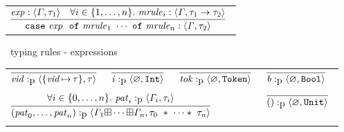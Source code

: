 \documentclass[final]{article}
\begin{document}
\begin{figure}[t]
\begin{small}
\begin{center}
\begin{tabular}{llll}

    \multicolumn{4}{l}{
      $\MEMinferc
      {\MEMtyping{\CONScaseexp{\METAexp}{\CONScasen{\METAmrule_1}{\METAmrule_n}}}{\METAityenv}{\METAity_2}}
      {\MEMtyping{\METAexp}{\METAityenv}{\METAity_1}}
      {\forallexp{i\in\{1,\dots,n\}}{\MEMtyping{\METAmrule_i}{\METAityenv}{\CONSarrowty{\METAity_1}{\METAity_2}}}}$
    }
  \end{tabular}
\end{center}
\caption{\eml\ typing rules - expressions}
\label{fig:typing-rules-expressions}
\end{small}
\end{figure}


\begin{figure}[t]
\begin{small}
\begin{center}
  \begin{tabular}{llll}
    \multicolumn{1}{l}{
      $\MEMinfera
      {\MEMtypingpat{\METAvid}{\{\asgn{\METAvid}{\METAity}\}}{\METAity}}$
    }

    &

    \multicolumn{1}{l}{
      $\MEMinfera
      {\MEMtypingpat{\METAint}{\CONSemptyityenv}{\CONSintty}}$
    }

    &

    \multicolumn{1}{l}{
      $\MEMinfera
      {\MEMtypingpat{\METAatom}{\CONSemptyityenv}{\CONSatomty}}$
    }

    &

    \multicolumn{1}{l}{
      $\MEMinfera
      {\MEMtypingpat{\METAbool}{\CONSemptyityenv}{\CONSboolty}}$
    }

    \\
    &&&
    \\

    \multicolumn{3}{l}{
      $\MEMinferb
      {\MEMtypingpat{\CONStupn{\METApat_0}{\METApat_n}}{\MEMequnion{\METAityenv_1}{\MEMequnion{\cdots}{\METAityenv_n}}}{\CONStuptyn{\METAity_0}{\METAity_n}}}
      {\forallexp{i\in\{0,\dots,n\}}{\MEMtypingpat{\METApat_i}{\METAityenv_i}{\METAity_i}}}$
    }

    &

    \multicolumn{1}{l}{
      $\MEMinfera
      {\MEMtypingpat{()}{\CONSemptyityenv}{\CONSunitty}}$
    }

    \\
    &&&
    \\


\end{tabular}
\end{center}
\end{small}
\end{figure}
\end{document}
